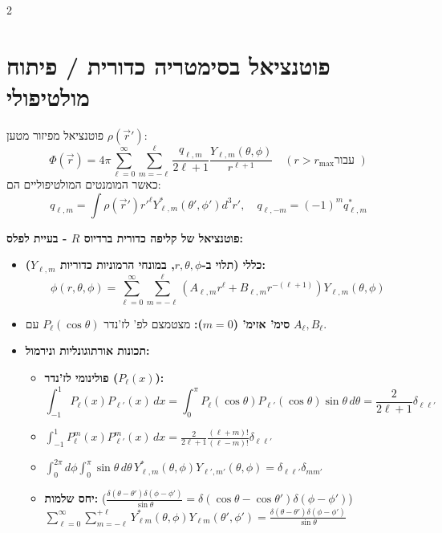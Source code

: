 \documentclass[10pt,a4paper]{article}
\begin{document}
\begin{multicols*}{2}
\section{פוטנציאל בסימטריה כדורית / פיתוח מולטיפולי}
פוטנציאל מפיזור מטען $\rho(\vec{r}')$:
\[
\Phi(\vec{r}) = 4\pi \sum_{\ell=0}^\infty \sum_{m=-\ell}^\ell \frac{q_{\ell,m}}{2\ell+1} \frac{Y_{\ell,m}(\theta,\phi)}{r^{\ell+1}} \quad (r > r_{\max} \text{עבור })
\]
כאשר המומנטים המולטיפוליים הם:
\[
q_{\ell,m} = \int \rho(\vec{r}') r'^\ell Y_{\ell,m}^*(\theta',\phi') d^3r', \quad q_{\ell,-m} = (-1)^m q_{\ell,m}^*
\]

\textbf{פוטנציאל של קליפה כדורית ברדיוס $R$ - בעיית לפלס:}
\begin{itemize}
    \item \textbf{כללי (תלוי ב-$r,\theta,\phi$, במונחי הרמוניות כדוריות $Y_{\ell,m}$):}
    \[
\phi(r, \theta, \phi) = \sum_{\ell=0}^{\infty} \sum_{m=-\ell}^{\ell} \left( A_{\ell,m} r^\ell + B_{\ell,m} r^{-(\ell+1)} \right) Y_{\ell,m}(\theta, \phi)
\]
    
    \item \textbf{סימ' אזימ' ($m=0$):} מצטמצם לפ' לז'נדר $P_\ell(\cos\theta)$ עם $A_\ell, B_\ell$.

    \item \textbf{תכונות אורתוגונליות ונירמול:}
    \begin{itemize}
        \item \textbf{פולינומי לז'נדר ($P_\ell(x)$):} 
         \[
        \int_{-1}^{1} P_\ell(x) P_{\ell'}(x) \, dx = \int_{0}^{\pi} P_\ell(\cos\theta) P_{\ell'}(\cos\theta) \sin\theta \, d\theta = \frac{2}{2\ell+1} \delta_{\ell\ell'}
        \]
        \item
        $
        \int_{-1}^{1} P_\ell^m(x) P_{\ell'}^m(x) \, dx = \frac{2}{2\ell+1} \frac{(\ell+m)!}{(\ell-m)!} \delta_{\ell\ell'}
        $
        \item $
        \int_{0}^{2\pi} d\phi \int_{0}^{\pi} \sin\theta \, d\theta \, Y_{\ell,m}^*(\theta,\phi) Y_{\ell',m'}(\theta,\phi) = \delta_{\ell\ell'} \delta_{mm'}
        $

        \item \textbf{יחס שלמות:} ($\frac{\delta(\theta - \theta') \delta(\phi - \phi')}{\sin\theta} = \delta(\cos\theta - \cos\theta') \delta(\phi - \phi')$) \\
        $
        \sum\limits_{\ell=0}^{\infty} \sum\limits_{m=-\ell}^{+\ell} Y_{\ell m}^*(\theta, \phi) Y_{\ell m}(\theta', \phi') = \frac{\delta(\theta - \theta') \delta(\phi - \phi')}{\sin\theta}
        $
        

\end{itemize}
\end{itemize}
\end{multicols*}
\end{document}
